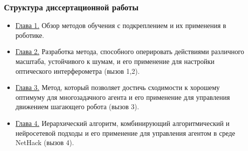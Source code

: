 \begin{frame}
    \frametitle{Структура диссертационной работы}
    \begin{itemize}
        \item \underline{Глава 1.} Обзор методов обучения с подкреплением и их применения в роботике. 
        \item \underline{Глава 2.} Разработка метода, способного оперировать действиями различного масштаба, устойчивого к шумам, и его применение для настройки оптического интерферометра (вызов 1,2).
        \item \underline{Глава 3.} Метод, который позволяет достичь сходимости к хорошему оптимуму для многозадачного агента и его применение  для управления движением шагающего робота (вызов 3).
        \item \underline{Глава 4.} Иерархический алгоритм, комбинирующий алгоритмический и нейросетевой подходы и его применение для управления агентом в среде NetHack (вызов 4).
    \end{itemize}
\end{frame}

